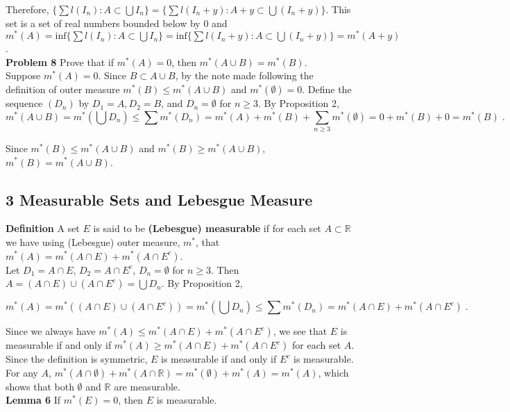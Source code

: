 \documentclass[a4paper]{article}
\begin{document}
Therefore, $\{\sum l(I_n) : A \subset \bigcup I_n \} = \{\sum l(I_n+y) : A +y\subset \bigcup (I_n+y) \}$. This set is a set of real numbers bounded below by 0 and $m^*(A) = \text{inf}\{\sum l(I_n) : A \subset \bigcup I_n \} = \text{inf}\{\sum l(I_n + y) : A \subset \bigcup (I_n+y) \} = m^*(A+y)$. \\

{\bf Problem 8} Prove that if $m^*(A) = 0$, then $m^*(A\cup B) = m^*(B)$.\\

Suppose $m^*(A) = 0$. Since $B \subset A\cup B$, by the note made following the definition of outer measure $m^*(B) \leq m^*(A\cup B)$ and $m^*(\emptyset) = 0$. Define the sequence $(D_n)$ by $D_1 = A, D_2 = B$, and $D_n = \emptyset$ for $n \geq 3$. By Proposition 2,  $$m^*(A\cup B) = m^*\left(\bigcup D_n\right) \leq \sum m^*(D_n) = m^*(A) + m^*(B) + \sum_{n\geq 3} m^*(\emptyset) = 0 + m^*(B) + 0 = m^*(B) \;.$$

Since $m^*(B) \leq m^*(A\cup B)$ and $m^*(B) \geq m^*(A\cup B)$, $m^*(B) = m^*(A\cup B)$.

\subsection*{3 Measurable Sets and Lebesgue Measure}

{\bf Definition} A set $E$ is said to be {\bf (Lebesgue) measurable} if for each set $A\subset \mathbb{R}$ we have using (Lebesgue) outer measure, $m^*$, that $m^*(A) = m^*(A\cap E) + m^*(A \cap E^c)$. \\

Let $D_1 = A\cap E$, $D_2 = A\cap E^c$, $D_n = \emptyset$ for $n \geq 3$. Then $A = (A\cap E)\cup (A\cap E^c) = \bigcup D_n$. By Proposition 2,

$$m^*(A) = m^*\left((A\cap E)\cup (A\cap E^c)\right) = m^*\left(\bigcup D_n \right)  \leq \sum m^*(D_n) = m^*(A\cap E) + m^*(A\cap E^c) \;.$$

Since we always have $m^*(A) \leq m^*(A\cap E) + m^*(A\cap E^c)$, we see that $E$ is measurable if and only if $m^*(A) \geq m^*(A\cap E) + m^*(A\cap E^c)$ for each set $A$. Since the definition is symmetric, $E$ is measurable if and only if $E^c$ is measurable. For any $A$, $m^*(A\cap \emptyset) + m^*(A\cap \mathbb{R}) = m^*(\emptyset) + m^*(A) = m^*(A)$, which shows that both $\emptyset$ and $\mathbb{R}$ are measurable. \\

{\bf Lemma 6} If $m^*(E) = 0$, then $E$ is measurable.\\
\end{document}
